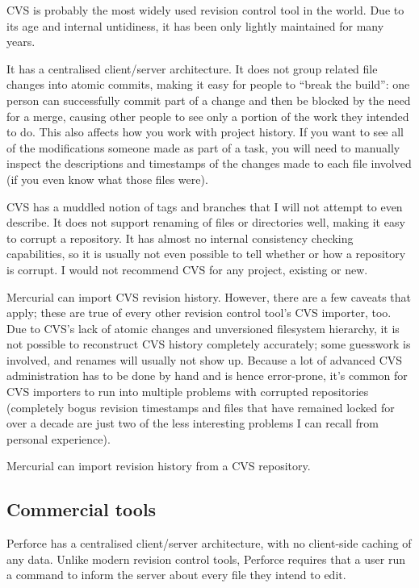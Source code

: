 CVS is probably the most widely used revision control tool in the
world.  Due to its age and internal untidiness, it has been only
lightly maintained for many years.

It has a centralised client/server architecture.  It does not group
related file changes into atomic commits, making it easy for people to
``break the build'': one person can successfully commit part of a
change and then be blocked by the need for a merge, causing other
people to see only a portion of the work they intended to do.  This
also affects how you work with project history.  If you want to see
all of the modifications someone made as part of a task, you will need
to manually inspect the descriptions and timestamps of the changes
made to each file involved (if you even know what those files were).

CVS has a muddled notion of tags and branches that I will not attempt
to even describe.  It does not support renaming of files or
directories well, making it easy to corrupt a repository.  It has
almost no internal consistency checking capabilities, so it is usually
not even possible to tell whether or how a repository is corrupt.  I
would not recommend CVS for any project, existing or new.

Mercurial can import CVS revision history.  However, there are a few
caveats that apply; these are true of every other revision control
tool's CVS importer, too.  Due to CVS's lack of atomic changes and
unversioned filesystem hierarchy, it is not possible to reconstruct
CVS history completely accurately; some guesswork is involved, and
renames will usually not show up.  Because a lot of advanced CVS
administration has to be done by hand and is hence error-prone, it's
common for CVS importers to run into multiple problems with corrupted
repositories (completely bogus revision timestamps and files that have
remained locked for over a decade are just two of the less interesting
problems I can recall from personal experience).

Mercurial can import revision history from a CVS repository.


\subsection{Commercial tools}

Perforce has a centralised client/server architecture, with no
client-side caching of any data.  Unlike modern revision control
tools, Perforce requires that a user run a command to inform the
server about every file they intend to edit.

